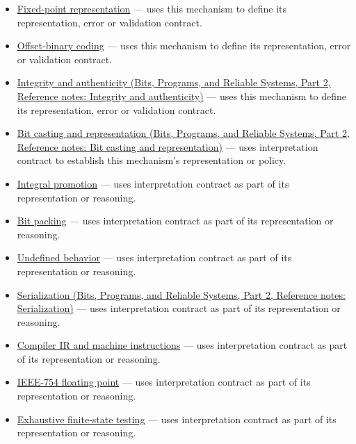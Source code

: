 \hypertarget{appendix-f414bd4ed05c-used-by}{}

\begin{itemize}
\tightlist
\item
  \hyperref[appendix-1d0dbe8924cc]{Fixed-point representation} --- uses this mechanism to define its representation, error or validation contract.
\item
  \hyperref[appendix-53a8cfb25f8d]{Offset-binary coding} --- uses this mechanism to define its representation, error or validation contract.
\item
  \href{../01-Bits-Programs-and-Reliable-Systems-P02/main.pdf\#nameddest=appendix-cbe594d1ab0a}{Integrity and authenticity (Bits, Programs, and Reliable Systems, Part 2, Reference notes: Integrity and authenticity)} --- uses this mechanism to define its representation, error or validation contract.
\item
  \href{../01-Bits-Programs-and-Reliable-Systems-P02/main.pdf\#nameddest=appendix-34ee45f161c1}{Bit casting and representation (Bits, Programs, and Reliable Systems, Part 2, Reference notes: Bit casting and representation)} --- uses interpretation contract to establish this mechanism's representation or policy.
\item
  \hyperref[appendix-45303d03796a]{Integral promotion} --- uses interpretation contract as part of its representation or reasoning.
\item
  \hyperref[appendix-1f9963e1a5d1]{Bit packing} --- uses interpretation contract as part of its representation or reasoning.
\item
  \hyperref[appendix-f558f5b4d8f2]{Undefined behavior} --- uses interpretation contract as part of its representation or reasoning.
\item
  \href{../01-Bits-Programs-and-Reliable-Systems-P02/main.pdf\#nameddest=appendix-91d09ebed979}{Serialization (Bits, Programs, and Reliable Systems, Part 2, Reference notes: Serialization)} --- uses interpretation contract as part of its representation or reasoning.
\item
  \hyperref[appendix-942ad41afb30]{Compiler IR and machine instructions} --- uses interpretation contract as part of its representation or reasoning.
\item
  \hyperref[appendix-343615f49ddf]{IEEE-754 floating point} --- uses interpretation contract as part of its representation or reasoning.
\item
  \hyperref[appendix-05db24ccc28a]{Exhaustive finite-state testing} --- uses interpretation contract as part of its representation or reasoning.

\end{itemize}
